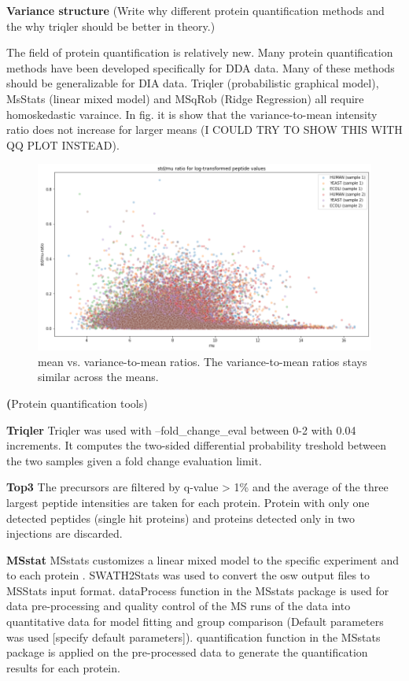 \documentclass[10pt,letterpaper]{article}
\begin{document}
\textbf{Variance structure}
(Write why different protein quantification methods and the why triqler should be better in theory.) 

The field of protein quantification is relatively new. Many protein quantification methods have been developed specifically for DDA data. Many of these methods should be generalizable for DIA data. Triqler (probabilistic graphical model), MsStats (linear mixed model) and MSqRob (Ridge Regression) all require homoskedastic varaince. In fig. it is show that the variance-to-mean intensity ratio does not increase for larger means (I COULD TRY TO SHOW THIS WITH QQ PLOT INSTEAD). 

\begin{figure}[htp]
    \centering
    \includegraphics[width=12cm]{../../result/2021-08-13_docs_plots/variance_to_mean_plot.png}
    \caption{mean vs. variance-to-mean ratios. The variance-to-mean ratios stays similar across the means.}
    \label{fig:variance_to_mean_ratio}
\end{figure}

\textbf(Protein quantification tools)


\textbf{Triqler}
Triqler was used with --fold\_change\_eval between 0-2 with 0.04 increments. It computes the two-sided differential probability treshold between the two samples given a fold change evaluation limit. 

\textbf{Top3}
The precursors are filtered by q-value > 1\% and the average of the three largest peptide intensities are taken for each protein. Protein with only one detected peptides (single hit proteins) and proteins detected only in two injections are discarded.

\textbf{MSstat}
 MSstats customizes a linear mixed model to the specific experiment and to each protein . SWATH2Stats was used to convert the osw output files to MSStats input format. dataProcess function in the MSstats package is used for data pre-processing and quality control of the MS runs of the data into quantitative data for model fitting and group comparison (Default parameters was used [specify default parameters]). quantification function in the MSstats package is applied on the pre-processed data to generate the quantification results for each protein.
\end{document}
